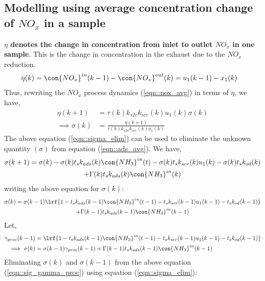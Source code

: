 \subsection{Modelling using average concentration change of $NO_x$ in a sample}
\textbf{$\eta$ denotes the change in concentration from inlet to outlet $NO_x$ in one sample}. This is the change in concentration in the exhaust due to the $NO_x$ reduction.
%
\begin{align}
        \eta(k) &= \con{NO_x}^{in}(k-1) - \con{NO_x}^{out}(k) = u_1(k-1) - x_1(k)
\end{align}
%
Thus, rewriting the $NO_x$ process dynamics (\ref{eqn::nox_avg}) in terms of $\eta$, we have,
\begin{align}
        \eta(k+1) &= \tau(k) k_{s2v} k_{scr}(k) u_1(k) \sigma(k)\\
        \implies \sigma(k) &= \frac{\eta(k+1)}{\tau(k) k_{s2v} k_{scr}(k) u_1(k)}
        \label{eqn::sigma_elim}
\end{align}
%
The above equation (\ref{eqn::sigma_elim}) can be used to eliminate the unknown quantity $(\sigma)$ from equation (\ref{eqn::ads_avg}). We have,
\begin{multline}
        \sigma(k+1) = \sigma(k) - \sigma(k) t_s k_{ads}(k) \con{NH_3}^{in}(t)
                        - \sigma(k) t_s k_{scr}(k) u_1(k)
                        - \sigma(k) t_s k_{od}(k)
                        \\ + \Gamma(k) t_s k_{ads}(k) \con{NH_3}^{in}(k)
\end{multline}
writing the above equation for $\sigma(k)$:
\begin{multline*}
         \sigma(k) = \sigma(k-1)\lrf{1 -  t_s k_{ads}(k-1) \con{NH_3}^{in}(t-1)
                        -  t_s k_{scr}(k-1) u_1(k-1)
                        -  t_s k_{od}(k-1)}
                        \\ + \Gamma(k-1) t_s k_{ads}(k-1) \con{NH_3}^{in}(k-1)
\end{multline*}
Let,
\begin{align}
        \gamma_{proc}(k-1) &= \lrf{1 -  t_s k_{ads}(k-1) \con{NH_3}^{in}(t-1)
                        -  t_s k_{scr}(k-1) u_1(k-1)
                        -  t_s k_{od}(k-1)}
        \label{eqn::gamma_proc}
        \\
        \implies \sigma(k) &= \sigma(k-1) \gamma_{proc}(k-1) + \Gamma(k-1) t_s k_{ads}(k-1) \con{NH_3}^{in}(k-1)
        \label{eqn::sig_gamma_proc}
\end{align}
Eliminating $\sigma(k)$ and $\sigma(k-1)$ from the above equation (\ref{eqn::sig_gamma_proc}) using equation (\ref{eqn::sigma_elim}):

